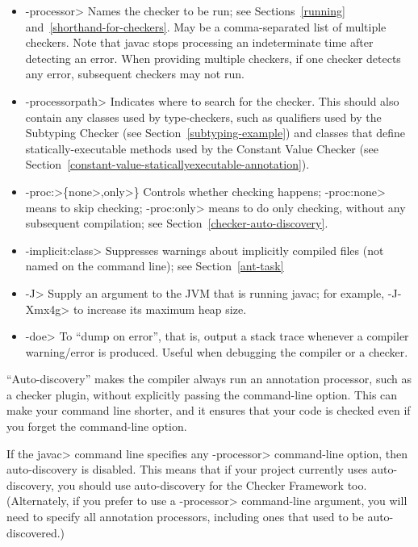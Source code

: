 \begin{itemize}
\item \<-processor> Names the checker to be
  run; see Sections~\ref{running} and~\ref{shorthand-for-checkers}.
  May be a comma-separated list of multiple checkers.  Note that javac
  stops processing an indeterminate time after detecting an error.  When
  providing multiple checkers, if one checker detects any error, subsequent
  checkers may not run.
\item \<-processorpath> Indicates where to search for the
  checker.  This should also contain any classes used by type-checkers,
  such as qualifiers used by the Subtyping Checker (see
  Section~\ref{subtyping-example}) and classes that define
  statically-executable methods used by the Constant Value Checker (see
  Section~\ref{constant-value-staticallyexecutable-annotation}).
\item \<-proc:>\{\<none>,\<only>\} Controls whether checking
  happens; \<-proc:none>
  means to skip checking; \<-proc:only> means to do only
  checking, without any subsequent compilation; see
  Section~\ref{checker-auto-discovery}.
\item \<-implicit:class> Suppresses warnings about implicitly compiled files
  (not named on the command line); see Section~\ref{ant-task}
\item \<-J> Supply an argument to the JVM that is running javac;
  for example, \<-J-Xmx4g> to increase its maximum heap size.
\item \<-doe> To ``dump on error'', that is, output a stack trace
  whenever a compiler warning/error is produced. Useful when debugging
  the compiler or a checker.
\end{itemize}



``Auto-discovery'' makes the  compiler always run an
annotation processor, such as a checker
plugin, without explicitly passing the 
command-line option.  This can make your command line shorter, and it ensures
that your code is checked even if you forget the command-line option.

If the \<javac> command line specifies any \<-processor> command-line
option, then auto-discovery is disabled.  This means that if your project
currently uses auto-discovery, you should use auto-discovery for the
Checker Framework too.  (Alternately, if you prefer to use a \<-processor>
command-line argument, you will need to specify all annotation processors,
including ones that used to be auto-discovered.)

